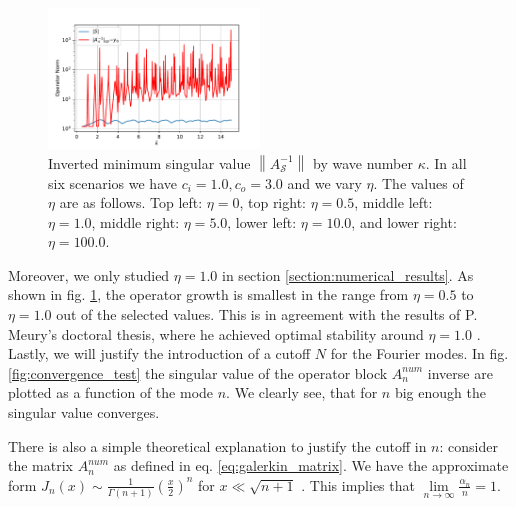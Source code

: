 \documentclass[12pt,journal,compsoc, onecolumn]{IEEEtran}
\begin{document}
\begin{figure}
    \includegraphics[width=0.5\textwidth]{simulation_scenario_5indexrange_-30.0-0.0_y_0_7.117865219377693.pdf} 
    \caption{Inverted minimum singular value $\left\|A_{\mathcal{S}}^{-1}\right\|$ by wave number $\kappa$. In all six scenarios we have $c_i = 1.0, c_o = 3.0$ and we vary $\eta$. The values of $\eta$ are as follows. Top left: $\eta = 0$, top right: $\eta = 0.5$, middle left: $\eta = 1.0$, middle right: $\eta = 5.0$,  lower left: $\eta = 10.0$, and lower right: $\eta = 100.0$.}
     \label{fig:eta_other_results}
\end{figure}
\noindent Moreover, we only studied $\eta = 1.0$ in section \ref{section:numerical_results}. As shown in fig. \ref{fig:eta_other_results}, the operator growth is smallest in the range from $\eta = 0.5$ to $\eta = 1.0$ out of the selected values. This is in agreement with the results of P. Meury's doctoral thesis, where he achieved optimal stability around $\eta = 1.0$ \cite{meury2007stable}.
\\
Lastly, we will justify the introduction of a cutoff $N$ for the Fourier modes. In fig. \ref{fig:convergence_test} the singular value of the operator block $A^{num}_n$ inverse are plotted as a function of the mode $n$. We clearly see, that for $n$ big enough the singular value converges. 
\begin{figure}
\end{figure}
\label{fig:convergence_test}
\noindent
There is also a simple theoretical explanation to justify the cutoff in $n$: consider the matrix $A^{num}_n$ as defined in eq. \ref{eq:galerkin_matrix}. We have the approximate form \(J_{n}(x) \sim \frac{1}{\Gamma(n+1)}\left(\frac{x}{2}\right)^{n}\) for \(x \ll \sqrt{n+1}\) \cite{abramowitz1972abramowitz}. This implies that $\lim\limits_{n \rightarrow \infty}\frac{\alpha_n}{n} = 1$.
\end{document}
